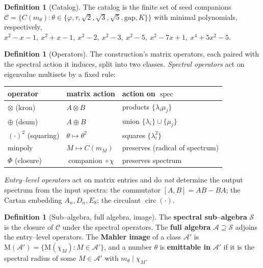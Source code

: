\documentclass[11pt]{article}
\theoremstyle{plain}
\theoremstyle{definition}
\newtheorem{definition}[theorem]{Definition}
\theoremstyle{remark}
\newcommand{\Mah}{\mathrm{M}}
\newcommand{\spec}{\operatorname{spec}}
\newcommand{\charp}{\chi}
\newcommand{\Scal}{\mathcal{S}}
\newcommand{\Acal}{\mathcal{A}}
\newcommand{\Ccal}{\mathcal{C}}
\begin{document}
\begin{definition}[Catalog]\label{def:catalog}
The catalog is the finite set of seed companions $\Ccal=\{C(m_\theta):\theta\in\{\varphi,\tau,\sqrt2,\sqrt3,\sqrt5,\mathrm{gap},K\}\}$ with minimal polynomials, respectively, $x^2-x-1,\ x^2+x-1,\ x^2-2,\ x^2-3,\ x^2-5,\ x^2-7x+1,\ x^4+5x^2-5$.
\end{definition}

\begin{definition}[Operators]\label{def:ops}
The construction's matrix operators, each paired with the spectral action it induces, split into two classes.
\emph{Spectral operators} act on eigenvalue multisets by a fixed rule:
\begin{center}
\renewcommand{\arraystretch}{1.2}
\begin{tabular}{@{}lll@{}}
\toprule
operator & matrix action & action on $\spec$ \\
\midrule
$\otimes$ (kron) & $A\otimes B$ & products $\{\lambda_i\mu_j\}$ \\
$\oplus$ (dsum) & $A\oplus B$ & union $\{\lambda_i\}\cup\{\mu_j\}$ \\
$(\cdot)^2$ (squaring) & $\theta\mapsto\theta^2$ & squares $\{\lambda_i^2\}$ \\
$\mathrm{minpoly}$ & $M\mapsto C(m_M)$ & preserves (radical of spectrum) \\
$\Phi$ (closure) & $\operatorname{companion}\circ\charp$ & preserves spectrum \\
\bottomrule
\end{tabular}
\end{center}
\emph{Entry--level operators} act on matrix entries and do \emph{not} determine the output spectrum from the input spectra: the commutator $[A,B]=AB-BA$; the Cartan embedding $A_n,D_n,E_8$; the circulant $\operatorname{circ}(\cdot)$.
\end{definition}

\begin{definition}[Sub--algebra, full algebra, image]\label{def:images}
The \textbf{spectral sub--algebra} $\Scal$ is the closure of $\Ccal$ under the spectral operators. The \textbf{full algebra} $\Acal\supseteq\Scal$ adjoins the entry--level operators. The \textbf{Mahler image} of a class $\Acal'$ is $\Mah(\Acal')=\{\Mah(\charp_M):M\in\Acal'\}$, and a number $\theta$ is \textbf{emittable in} $\Acal'$ if it is the spectral radius of some $M\in\Acal'$ with $m_\theta\mid\charp_M$.
\end{definition}
\end{document}
